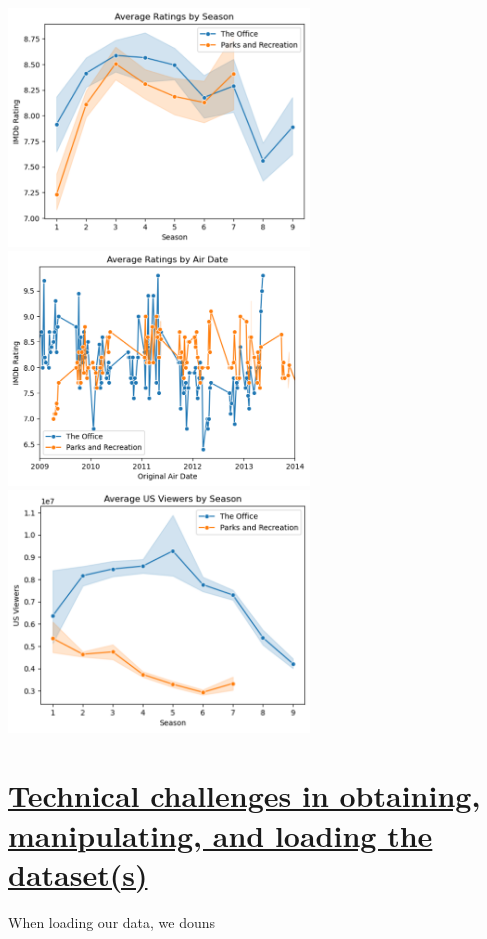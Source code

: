 \documentclass{article}
\begin{document}
\includegraphics[width=0.6\textwidth]{avgRating.png}
\\
\includegraphics[width=0.6\textwidth]{avgRatingbyAir.png}
\\
\includegraphics[width=0.6\textwidth]{avgViewerSeason.png}


\section*{\underline{Technical challenges in obtaining, manipulating, and loading the dataset(s)}}
When loading our data, we douns

\end{document}
